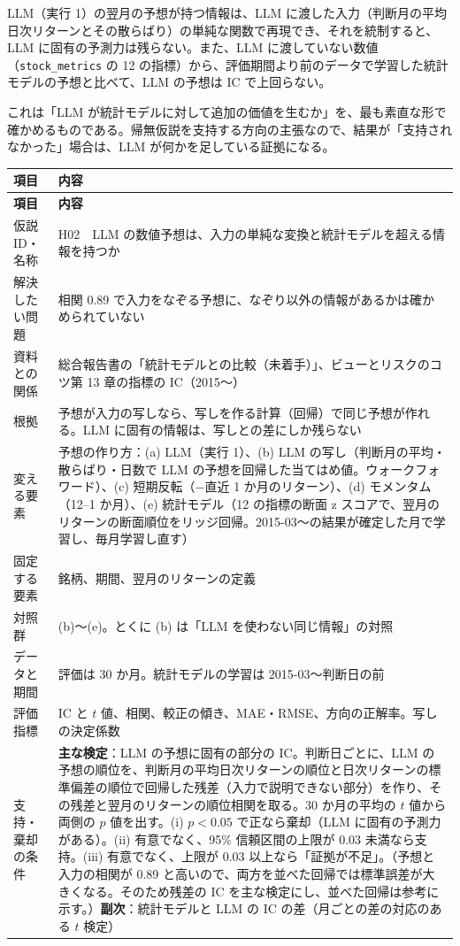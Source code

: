 \documentclass[xelatex,ja=standard,jafont=haranoaji,a4paper,10pt,openany]{bxjsreport}
\newcommand{\code}[1]{\texttt{#1}}
\newenvironment{plan}{\small\begin{longtable}{p{3.3cm}p{11.6cm}}\toprule\textbf{項目} & \textbf{内容} \\\midrule\endfirsthead
\toprule\textbf{項目} & \textbf{内容} \\\midrule\endhead\bottomrule\endfoot}{\end{longtable}}
\begin{document}
\begin{hypbox}
LLM（実行 1）の翌月の予想が持つ情報は、LLM に渡した入力（判断月の平均日次リターンとその散らばり）の単純な関数で再現でき、それを統制すると、LLM に固有の予測力は残らない。また、LLM に渡していない数値（\code{stock\_metrics} の 12 の指標）から、評価期間より前のデータで学習した統計モデルの予想と比べて、LLM の予想は IC で上回らない。
\end{hypbox}

これは「LLM が統計モデルに対して追加の価値を生むか」を、最も素直な形で確かめるものである。帰無仮説を支持する方向の主張なので、結果が「支持されなかった」場合は、LLM が何かを足している証拠になる。

\begin{plan}
仮説 ID・名称 & H02　LLM の数値予想は、入力の単純な変換と統計モデルを超える情報を持つか \\
解決したい問題 & 相関 0.89 で入力をなぞる予想に、なぞり以外の情報があるかは確かめられていない \\
資料との関係 & 総合報告書の「統計モデルとの比較（未着手）」、ビューとリスクのコツ第 13 章の指標の IC（2015〜） \\
根拠 & 予想が入力の写しなら、写しを作る計算（回帰）で同じ予想が作れる。LLM に固有の情報は、写しとの差にしか残らない \\
変える要素 & 予想の作り方：(a) LLM（実行 1）、(b) LLM の写し（判断月の平均・散らばり・日数で LLM の予想を回帰した当てはめ値。ウォークフォワード）、(c) 短期反転（$-$直近 1 か月のリターン）、(d) モメンタム（12--1 か月）、(e) 統計モデル（12 の指標の断面 z スコアで、翌月のリターンの断面順位をリッジ回帰。2015-03〜の結果が確定した月で学習し、毎月学習し直す） \\
固定する要素 & 銘柄、期間、翌月のリターンの定義 \\
対照群 & (b)〜(e)。とくに (b) は「LLM を使わない同じ情報」の対照 \\
データと期間 & 評価は 30 か月。統計モデルの学習は 2015-03〜判断日の前 \\
評価指標 & IC と $t$ 値、相関、較正の傾き、MAE・RMSE、方向の正解率。写しの決定係数 \\
支持・棄却の条件 & \textbf{主な検定}：LLM の予想に固有の部分の IC。判断日ごとに、LLM の予想の順位を、判断月の平均日次リターンの順位と日次リターンの標準偏差の順位で回帰した残差（入力で説明できない部分）を作り、その残差と翌月のリターンの順位相関を取る。30 か月の平均の $t$ 値から両側の $p$ 値を出す。(i) $p<0.05$ で正なら棄却（LLM に固有の予測力がある）。(ii) 有意でなく、95\% 信頼区間の上限が 0.03 未満なら支持。(iii) 有意でなく、上限が 0.03 以上なら「証拠が不足」。（予想と入力の相関が 0.89 と高いので、両方を並べた回帰では標準誤差が大きくなる。そのため残差の IC を主な検定にし、並べた回帰は参考に示す。）\textbf{副次}：統計モデルと LLM の IC の差（月ごとの差の対応のある $t$ 検定） \\

\end{plan}
\end{document}
